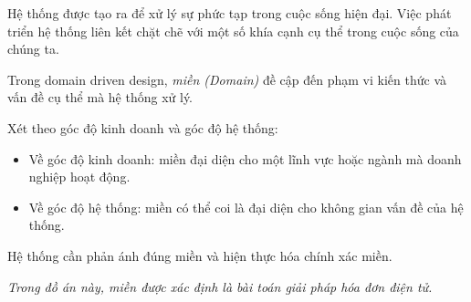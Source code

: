 Hệ thống được tạo ra để xử lý sự phức tạp trong cuộc sống hiện đại. Việc phát triển hệ thống liên kết chặt chẽ với một số khía cạnh cụ thể trong cuộc sống của chúng ta.

Trong domain driven design, \emph{miền (Domain)} đề cập đến phạm vi kiến thức và vấn đề cụ thể mà hệ thống xử lý.

Xét theo góc độ kinh doanh và góc độ hệ thống:

\begin{itemize}

\item Về góc độ kinh doanh: miền đại diện cho một lĩnh vực hoặc ngành mà doanh nghiệp hoạt động.

\item Về góc độ hệ thống: miền có thể coi là đại diện cho không gian vấn đề của hệ thống.

\end{itemize}

Hệ thống cần phản ánh đúng miền và hiện thực hóa chính xác miền.

\begin{example} \emph{Trong đồ án này, miền được xác định là bài toán giải pháp hóa đơn điện tử.}

\end{example}
